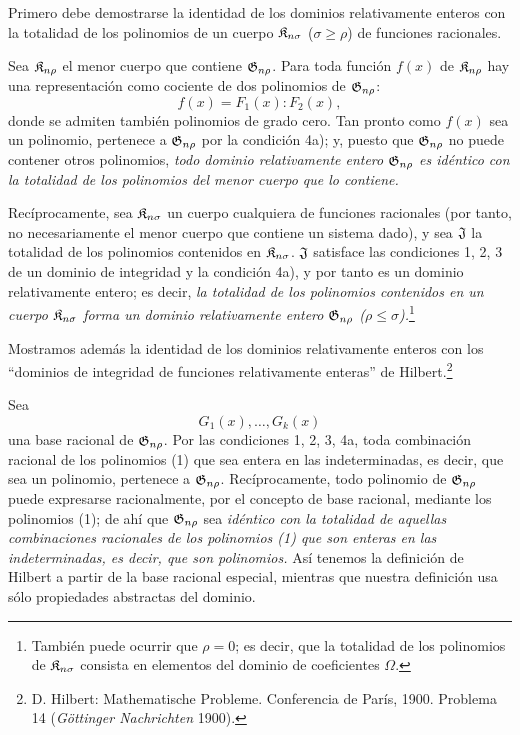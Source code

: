 \documentclass[11pt]{article}
\begin{document}
Primero debe demostrarse la identidad de los dominios relativamente enteros con la totalidad de los polinomios de un cuerpo $\mathfrak{K}_{n\sigma}$ ($\sigma\ge\rho$) de funciones racionales.

Sea $\mathfrak{K}_{n\rho}$ el menor cuerpo que contiene $\mathfrak{G}_{n\rho}$. Para toda función $f(x)$ de $\mathfrak{K}_{n\rho}$ hay una representación como cociente de dos polinomios de $\mathfrak{G}_{n\rho}$:
\[
  f(x)=F_1(x):F_2(x),
\]
donde se admiten también polinomios de grado cero. Tan pronto como $f(x)$ sea un polinomio, pertenece a $\mathfrak{G}_{n\rho}$ por la condición 4a); y, puesto que $\mathfrak{G}_{n\rho}$ no puede contener otros polinomios, \emph{todo dominio relativamente entero $\mathfrak{G}_{n\rho}$ es idéntico con la totalidad de los polinomios del menor cuerpo que lo contiene.}

Recíprocamente, sea $\mathfrak{K}_{n\sigma}$ un cuerpo cualquiera de funciones racionales (por tanto, no necesariamente el menor cuerpo que contiene un sistema dado), y sea $\mathfrak{J}$ la totalidad de los polinomios contenidos en $\mathfrak{K}_{n\sigma}$. $\mathfrak{J}$ satisface las condiciones 1, 2, 3 de un dominio de integridad y la condición 4a), y por tanto es un dominio relativamente entero; es decir, \emph{la totalidad de los polinomios contenidos en un cuerpo $\mathfrak{K}_{n\sigma}$ forma un dominio relativamente entero $\mathfrak{G}_{n\rho}$ ($\rho\le\sigma$).}\footnote{También puede ocurrir que $\rho=0$; es decir, que la totalidad de los polinomios de $\mathfrak{K}_{n\sigma}$ consista en elementos del dominio de coeficientes $\Omega$.}

Mostramos además la identidad de los dominios relativamente enteros con los ``dominios de integridad de funciones relativamente enteras'' de Hilbert.\footnote{D. Hilbert: Mathematische Probleme. Conferencia de París, 1900. Problema 14 (\emph{Göttinger Nachrichten} 1900).}

Sea
\begin{equation}
  G_1(x),\ldots,G_k(x)
\tag{1}
\end{equation}
una base racional de $\mathfrak{G}_{n\rho}$. Por las condiciones 1, 2, 3, 4a, toda combinación racional de los polinomios (1) que sea entera en las indeterminadas, es decir, que sea un polinomio, pertenece a $\mathfrak{G}_{n\rho}$. Recíprocamente, todo polinomio de $\mathfrak{G}_{n\rho}$ puede expresarse racionalmente, por el concepto de base racional, mediante los polinomios (1); de ahí que $\mathfrak{G}_{n\rho}$ sea \emph{idéntico con la totalidad de aquellas combinaciones racionales de los polinomios (1) que son enteras en las indeterminadas, es decir, que son polinomios.} Así tenemos la definición de Hilbert a partir de la base racional especial, mientras que nuestra definición usa sólo propiedades abstractas del dominio.
\end{document}
